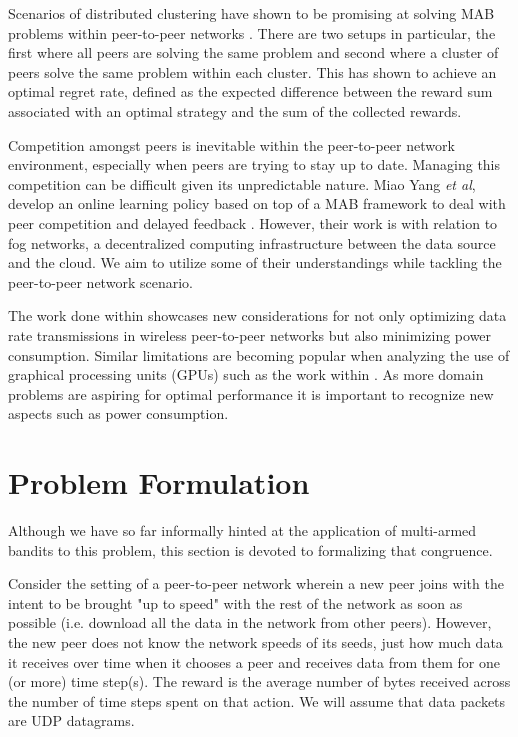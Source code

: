 \documentclass{article}
\begin{document}
Scenarios of distributed clustering have shown to be promising at solving MAB problems within peer-to-peer networks \cite{dist_clustering_p2p}. There are two setups in 
particular, the first where all peers are solving the same problem and second where a cluster of peers solve the same problem within each cluster. This has shown to achieve 
an optimal regret rate, defined as the expected difference between the reward sum associated with an optimal strategy and the sum of the collected rewards. 

Competition amongst peers is inevitable within the peer-to-peer network environment, especially when peers are trying to stay up to date. Managing this competition can be 
difficult given its unpredictable nature. Miao Yang \textit{et al}, develop an online learning policy based on top of a MAB framework to deal with peer competition and 
delayed feedback \cite{p2p_offloading_with_delayed_feedback}. However, their work is with relation to fog networks, a decentralized computing infrastructure between 
the data source and the cloud. We aim to utilize some of their understandings while tackling the peer-to-peer network scenario. 

The work done within \cite{p2p_net_sender_scheduling} showcases new considerations for not only optimizing data rate transmissions in wireless peer-to-peer networks but also 
minimizing power consumption. Similar limitations are becoming popular when analyzing the use of graphical processing units (GPUs) such as the work within \cite{gpu_eng}. As 
more domain problems are aspiring for optimal performance it is important to recognize new aspects such as power consumption. 



\section{Problem Formulation}

Although we have so far informally hinted at the application of multi-armed bandits to this problem, this section is devoted to formalizing that congruence.

Consider the setting of a peer-to-peer network wherein a new peer joins with the intent to be brought "up to speed" with the rest of the network as soon as 
possible (i.e. download all the data in the network from other peers). However, the new peer does not know the network speeds of its seeds, just how much data 
it receives over time when it chooses a peer and receives data from them for one (or more) time step(s). The reward is the average number of bytes received across 
the number of time steps spent on that action. We will assume that data packets are UDP datagrams.
\end{document}

